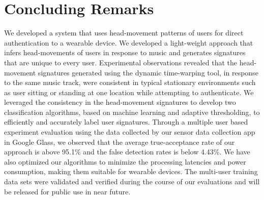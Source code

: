 \section{Concluding Remarks}
\label{sec:conc}

We developed a system that uses head-movement patterns of users for direct
authentication to a wearable device. We developed a light-weight approach that infers
head-movements of users in response to music and generates signatures
that are unique to every user.
Experimental observations revealed that the head-movement signatures generated
using the dynamic time-warping tool, in response to the same music track, were
consistent in typical stationary environments such as user sitting or
standing at one location while attempting to authenticate. We leveraged the
consistency in the head-movement signatures to develop two classification
algorithms, based on machine learning and adaptive thresholding, to
efficiently and accurately label user signatures.
Through a multiple user based experiment evaluation using the data collected
by our sensor data collection app in Google Glass, we observed that the
average true-acceptance rate of our approach is above 95.1$\%$ and the false
detection rates is below 4.43$\%$. We have also optimized our algorithms to minimize the processing latencies and power consumption, making them suitable for wearable devices.
The multi-user training data sets were validated and verified during the
course of our evaluations and will be released for public use in near future.

\iffalse
In this paper, we present the design, implementation and evaluation
of Headbanger, a head gesture based authentication system.
Headbanger generates a signature from user's head-movements in
response to short duration of audio track with fast beats, and uses
this signature as the behavioral biometric for authentication.
Through extensive experiments on the prototype on Google Glass
involving ?? users, we demonstrated that Headbander can achieve **\%
accuracy and thus with proper audio stimuli, head-movement alone
will be reasonably sufficient to serve a effective behavioral
biometric for authentication. We believe this work will be the basis
for using audio catalyst to enrich more useful human contextual
applications.
\fi